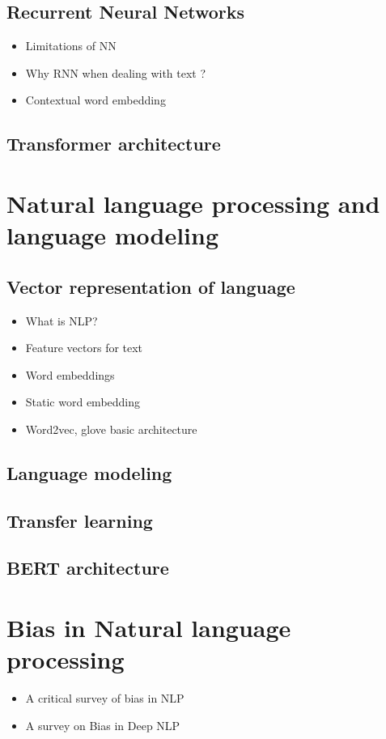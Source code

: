\subsection { Recurrent Neural Networks }
            \begin{itemize}
                \item Limitations of NN 
                \item Why RNN when dealing with text ?
                \item Contextual word embedding
            \end{itemize}

\subsection{Transformer architecture}
    
\section{Natural language processing and language modeling}
    \subsection{Vector representation of language}
    \begin{itemize}
        \item What is NLP?
        \item Feature vectors for text 
        \item Word embeddings
        \item Static word embedding
        \item Word2vec, glove basic architecture
    \end{itemize}
    \subsection{Language modeling}
    \subsection{Transfer learning}
    \subsection{BERT architecture}
    \section{Bias in Natural language processing}
\begin{itemize}
    \item A critical survey of bias in NLP \cite{blodgett2020language}
    \item A survey on Bias in Deep NLP \cite{garrido2021survey}
\end{itemize}